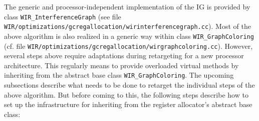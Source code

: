 The generic and processor-independent implementation of the \gls{IG} is provided by class \texttt{WIR\_InterferenceGraph} (see file \texttt{WIR/optimizations/gcregallocation/wirinterferencegraph.cc}).
Most of the above algorithm is also realized in a generic way within class \texttt{WIR\_GraphColoring} (cf. file \texttt{WIR/optimizations/gcregalloca\-tion/wirgraphcoloring.cc}).
However, several steps above require adaptations during retargeting for a new processor architecture.
This regularly means to provide overloaded virtual methods by inheriting from the abstract base class \texttt{WIR\_GraphColoring}.
The upcoming subsections describe what needs to be done to retarget the individual steps of the above algorithm.
But before coming to this, the following steps describe how to set up the infrastructure for inheriting from the register allocator's abstract base class:
